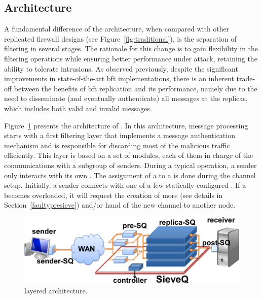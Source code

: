 \subsection{\sieveq Architecture}

A fundamental difference of the \sieveq architecture, when compared with other replicated firewall designs (see Figure~\ref{fig:traditional}), is the separation of filtering in several stages.
The rationale for this change is to gain flexibility in the filtering operations while ensuring better performance under attack, retaining the ability to tolerate intrusions.
As observed previously, despite the significant improvements in state-of-the-art \gls{bft} implementations, there is an inherent trade-off between the benefits of \gls{bft} replication and its performance, namely due to the need to disseminate (and eventually authenticate) all messages at the replicas, which includes both valid and invalid messages.

Figure~\ref{fig:arch} presents the architecture of \sieveq. 
In this architecture, message processing starts with a first filtering layer that implements a message authentication mechanism and is responsible for discarding most of the malicious traffic efficiently. 
This layer is based on a set of \presieve modules, each of them in charge of the communications with a subgroup of senders. 
During a typical operation, a sender only interacts with its own \presieve.
The assignment of a \sender to a \presieve is done during the channel setup.
Initially, a sender connects with one of a few statically-configured \presieves.
If a \presieve becomes overloaded, it will request the creation of more \presieves (see details in Section~\ref{faultypresieve}) and/or hand of the new \sender channel to another node.

\begin{figure}[h]
\begin{center}
\includegraphics[width=0.9\columnwidth]{images/images/arch.pdf}
\caption{\small \sieveq layered architecture.}
\label{fig:arch}
\end{center}
\end{figure}

